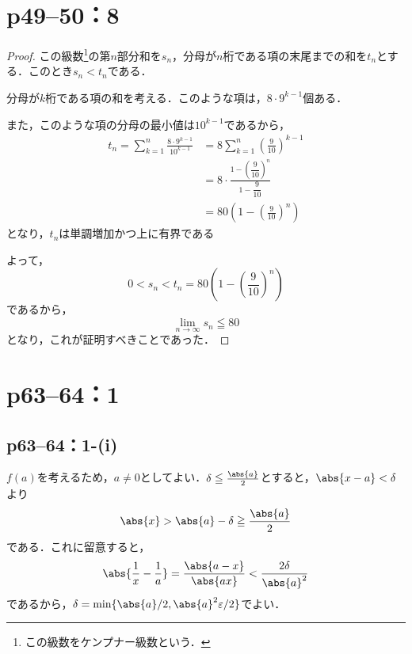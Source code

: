 \documentclass[a4paper,10pt,fleqn]{ltjsarticle}
\begin{document}
\newpage

\section*{p49--50：8}

\begin{tleftbar}
    \begin{proof}
        この級数\footnote{この級数をケンプナー級数という．}の第$n$部分和を$s_n$，分母が$n$桁である項の末尾までの和を$t_n$とする．このとき$s_n < t_n$である．

        分母が$k$桁である項の和を考える．このような項は，$8 \cdot 9^{k-1}$個ある．

        また，このような項の分母の最小値は$10^{k-1}$であるから，
        \begin{align*}
            t_n = \sum_{k=1}^{n} \frac{8 \cdot 9^{k-1}}{10^{k-1}} & = 8 \sum_{k=1}^{n} \left(\frac{9}{10}\right)^{k-1}               \\
                                                                  & = 8 \cdot \frac{1-\left(\dfrac{9}{10}\right)^n}{1-\dfrac{9}{10}} \\
                                                                  & = 80 \left(1-\left(\frac{9}{10}\right)^n\right)
        \end{align*}
        となり，$t_n$は単調増加かつ上に有界である

        よって，
        \[
            0 < s_n < t_n = 80 \left(1-\left(\frac{9}{10}\right)^n\right)
        \]
        であるから，
        \[
            \lim_{n \to \infty} s_n \leqq 80
        \]
        となり，これが証明すべきことであった．
    \end{proof}
\end{tleftbar}


\newpage


\section*{p63--64：1}

\subsection*{p63--64：1-(i)}

\begin{tleftbar}
    $f(a)$を考えるため，$a \ne 0$としてよい．$\delta \le \frac{\abs{a}}{2}$とすると，$\abs{x-a}<\delta$より
    \[
        \abs{x} > \abs{a}-\delta \ge \frac{\abs{a}}{2}
    \]
    である．これに留意すると，
    \[
        \abs{\frac{1}{x}-\frac{1}{a}}=\frac{\abs{a-x}}{\abs{ax}} <\frac{2 \delta}{\abs{a}^2}
    \]
    であるから，$\delta = \min \{ \abs{a}/2,\abs{a}^2\varepsilon/2 \}$でよい．
\end{tleftbar}
\end{document}
